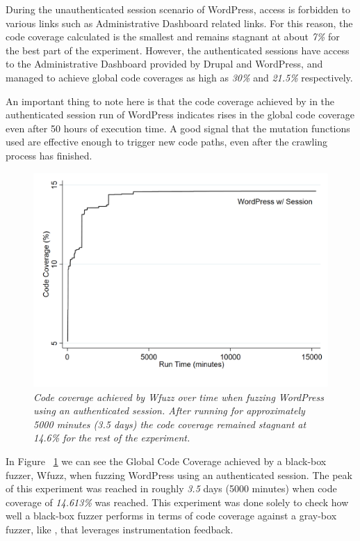 During the unauthenticated session scenario of WordPress, access is forbidden to various links such as Administrative Dashboard related links. For this reason, the code coverage calculated is the smallest and remains stagnant at about \emph{7\%} for the best part of the experiment. However, the authenticated sessions have access to the Administrative Dashboard provided by Drupal and WordPress, and managed to achieve global code coverages as high as \emph{30\%} and \emph{21.5\%} respectively. 

An important thing to note here is that the code coverage achieved by \pname{} in the authenticated session run of WordPress indicates rises in the global code coverage even after 50 hours of execution time. A good signal that the mutation functions used are effective enough to trigger new code paths, even after the crawling process has finished.
 
\begin{figure}[!htb]
  \centering \includegraphics[width=\linewidth]{figures/plot_coverage2.pdf}
  \captionsetup{justification=centering} 
  \caption[Accumulated Global Code Coverage using Wfuzz]{\textit{Code coverage achieved by Wfuzz over time when fuzzing WordPress using an authenticated session. After running for approximately 5000 minutes (3.5 days) the code coverage remained stagnant at 14.6\% for the rest of the experiment.}}
  \label{fig:plot_coverage2}
\end{figure}

In Figure ~\ref{fig:plot_coverage2} we can see the Global Code Coverage achieved by a black-box fuzzer, Wfuzz, when fuzzing WordPress using an authenticated session. The peak of this experiment was reached in roughly \emph{3.5} days (5000 minutes) when code coverage of \emph{14.613\%} was reached. This experiment was done solely to check how well a black-box fuzzer performs in terms of code coverage against a gray-box fuzzer, like \pname{}, that leverages instrumentation feedback. 

